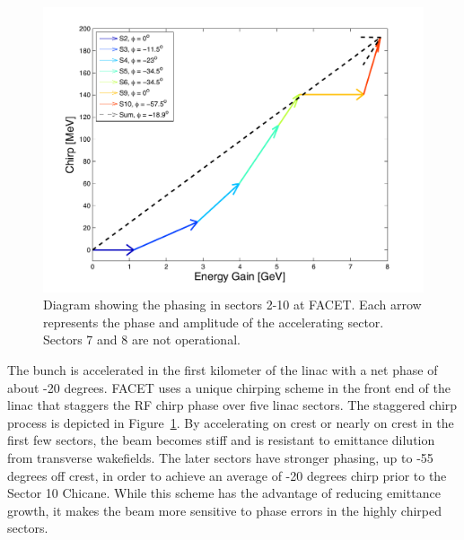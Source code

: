 \documentclass[%
twocolumn,
showpacs,preprintnumbers,
 aps,
prstab,
]{revtex4-1}
\begin{document}


\begin{figure}[hb]
  \includegraphics[width=\columnwidth]{figures/chirp_plot.pdf}
  \caption{Diagram showing the phasing in sectors 2-10 at FACET. Each arrow represents the phase and amplitude of the accelerating sector. Sectors 7 and 8 are not operational.}
  \label{stag}
\end{figure}

The bunch is accelerated in the first kilometer of the linac with a net phase of about -20 degrees. FACET uses a unique chirping scheme in the front end of the linac that staggers the RF chirp phase over five linac sectors. The staggered chirp process is depicted in Figure~\ref{stag}. By accelerating on crest or nearly on crest in the first few sectors, the beam becomes stiff and is resistant to emittance dilution from transverse wakefields. The later sectors have stronger phasing, up to -55 degrees off crest, in order to achieve an average of -20 degrees chirp prior to the Sector 10 Chicane. While this scheme has the advantage of reducing emittance growth, it makes the beam more sensitive to phase errors in the highly chirped sectors.
\end{document}
